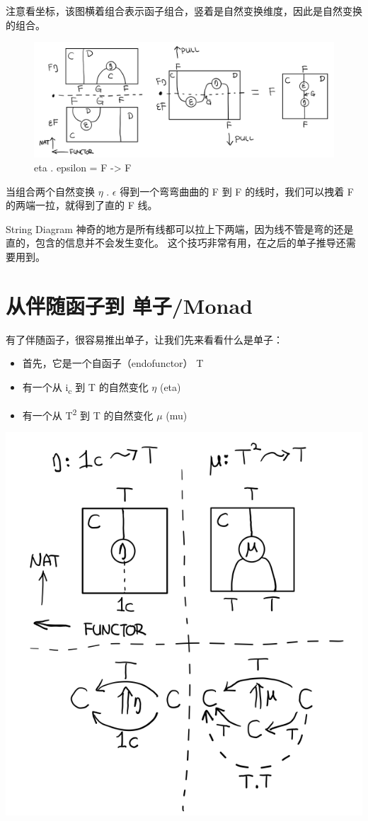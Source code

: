 \documentclass[letterspacing]{tufte-book}
\begin{document}
注意看坐标，该图横着组合表示函子组合，竖着是自然变换维度，因此是自然变换的组合。

\begin{figure}[htbp]
\centering
\includegraphics[width=.9\linewidth]{images/p1-ajunction-functor-compose-nat.png}
\caption{eta . epsilon = F -> F}
\end{figure}

当组合两个自然变换 \(\eta\) . \(\epsilon\) 得到一个弯弯曲曲的 F 到 F 的线时，我们可以拽着 F 的两端一拉，就得到了直的 F 线。

String Diagram 神奇的地方是所有线都可以拉上下两端，因为线不管是弯的还是直的，包含的信息并不会发生变化。
这个技巧非常有用，在之后的单子推导还需要用到。

\chapter{从伴随函子到 单子/Monad}
\label{sec:orga815b6c}
有了伴随函子，很容易推出单子，让我们先来看看什么是单子：

\begin{itemize}
\item 首先，它是一个自函子（endofunctor） T
\item 有一个从 i\textsubscript{c} 到 T 的自然变化 \(\eta\) (eta)
\item 有一个从 T\textsuperscript{2} 到 T 的自然变化 \(\mu\) (mu)
\end{itemize}

\begin{center}
\includegraphics[width=.9\linewidth]{images/p1-monad-properties.png}
\end{center}
\end{document}

